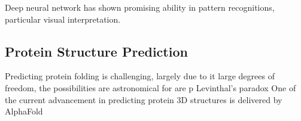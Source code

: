 Deep neural network has shown promising ability in pattern recognitions, particular visual interpretation.
\par 

\subsection{Protein Structure Prediction}
Predicting protein folding is challenging, largely due to it large degrees of freedom, the possibilities are astronomical for  are p Levinthal's paradox One of the current advancement in predicting protein 3D structures is delivered by AlphaFold